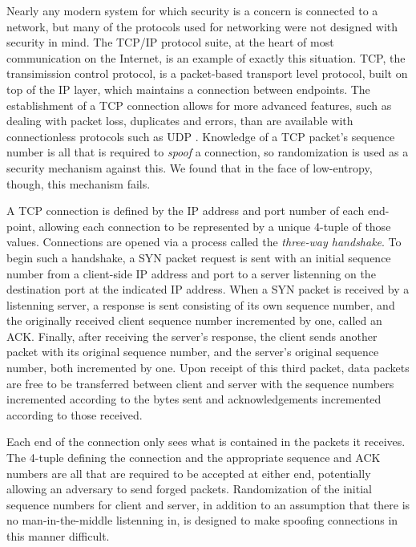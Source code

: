 Nearly any modern system for which security is a concern is connected to a network, but many of the protocols used for networking were not designed with security in mind.  The TCP/IP protocol suite, at the heart of most communication on the Internet, is an example of exactly this situation\cite{tcp_problems_back, tcp_attacks_methods}.  TCP, the transimission control protocol, is a packet-based transport level protocol, built on top of the IP layer, which maintains a connection between endpoints.  The establishment of a TCP connection allows for more advanced features, such as dealing with packet loss, duplicates and errors, than are available with connectionless protocols such as UDP \cite{illustrated}. Knowledge of a TCP packet's sequence number is all that is required to \textit{spoof} a connection, so randomization is used as a security mechanism against this\cite{tcp_RFC}. We found that in the face of low-entropy, though, this mechanism fails. 

A TCP connection is defined by the IP address and port number of each end-point, allowing each connection to be represented by a unique 4-tuple of those values.  Connections are opened via a process called the \textit{three-way handshake}.  To begin such a handshake, a SYN packet request is sent with an initial sequence number from a client-side IP address and port to a server listenning on the destination port at the indicated IP address. When a SYN packet is received by a listenning server, a response is sent consisting of its own sequence number, and the originally received client sequence number incremented by one, called an ACK.  Finally, after receiving the server's response, the client sends another packet with its original sequence number, and the server's original sequence number, both incremented by one.  Upon receipt of this third packet, data packets are free to be transferred between client and server with the sequence numbers incremented according to the bytes sent and acknowledgements incremented according to those received.

Each end of the connection only sees what is contained in the packets it receives.  The 4-tuple defining the connection and the appropriate sequence and ACK numbers are all that are required to be accepted at either end, potentially allowing an adversary to send forged packets.  Randomization of the initial sequence numbers for client and server, in addition to an assumption that there is no man-in-the-middle listenning in, is designed to make spoofing connections in this manner difficult.  

